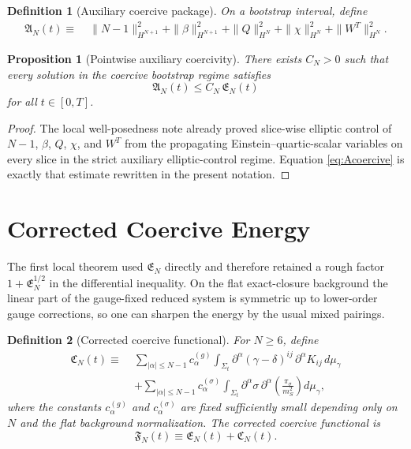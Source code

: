\documentclass[11pt]{article}
\newtheorem{definition}{Definition}
\newtheorem{proposition}{Proposition}
\begin{document}
\begin{definition}[Auxiliary coercive package]
On a bootstrap interval, define
\begin{align}
\mathfrak A_N(t)
\equiv\;&
\|N-1\|_{H^{N+1}}^2
+\|\beta\|_{H^{N+1}}^2
+\|Q\|_{H^N}^2
+\|\chi\|_{H^N}^2
+\|W^T\|_{H^N}^2.
\label{eq:AN}
\end{align}
\end{definition}

\begin{proposition}[Pointwise auxiliary coercivity]
There exists \(C_N>0\) such that every solution in the coercive bootstrap regime satisfies
\begin{equation}
\mathfrak A_N(t)\le C_N\,\mathfrak E_N(t)
\label{eq:Acoercive}
\end{equation}
for all \(t\in[0,T]\).
\end{proposition}

\begin{proof}
The local well-posedness note already proved slice-wise elliptic control of \(N-1\), \(\beta\), \(Q\), \(\chi\), and \(W^T\) from the propagating Einstein--quartic-scalar variables on every slice in the strict auxiliary elliptic-control regime. Equation \eqref{eq:Acoercive} is exactly that estimate rewritten in the present notation.
\end{proof}

\section{Corrected Coercive Energy}

The first local theorem used \(\mathfrak E_N\) directly and therefore retained a rough factor \(1+\mathfrak E_N^{1/2}\) in the differential inequality. On the flat exact-closure background the linear part of the gauge-fixed reduced system is symmetric up to lower-order gauge corrections, so one can sharpen the energy by the usual mixed pairings.

\begin{definition}[Corrected coercive functional]
For \(N\ge 6\), define
\begin{align}
\mathfrak C_N(t)
\equiv\;&
\sum_{|\alpha|\le N-1} c_\alpha^{(g)}
\int_{\Sigma_t}
\partial^\alpha(\gamma-\delta)^{ij}\,
\partial^\alpha K_{ij}\,d\mu_\gamma
\nonumber\\
&+
\sum_{|\alpha|\le N-1} c_\alpha^{(\sigma)}
\int_{\Sigma_t}
\partial^\alpha\sigma\,
\partial^\alpha\!\left(\frac{\pi_\sigma}{m_S^2}\right)d\mu_\gamma,
\label{eq:CN}
\end{align}
where the constants \(c_\alpha^{(g)}\) and \(c_\alpha^{(\sigma)}\) are fixed sufficiently small depending only on \(N\) and the flat background normalization. The \emph{corrected coercive functional} is
\begin{equation}
\mathfrak F_N(t)\equiv \mathfrak E_N(t)+\mathfrak C_N(t).
\label{eq:FN}
\end{equation}
\end{definition}
\end{document}
